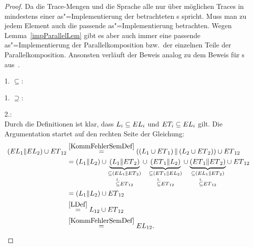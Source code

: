 \begin{proof}
  Da die Trace-Mengen und die Sprache alle nur über möglichen Traces in
  mindestens einer as"=Implementierung der betrachteten \MEIO{}s spricht. Muss
  man zu jedem Element auch die passende as"=Implementierung betrachten. Wegen
  Lemma~\ref{impParallelLem} gibt es aber auch immer eine passende
  as"=Implementierung der Parallelkomposition bzw.\ der einzelnen Teile der
  Parallelkomposition. Ansonsten verläuft der Beweis analog zu dem Beweis für
  \EIO{}s aus~\cite{Schinko2016BA}.

  1. \glqq$\subseteq$\grqq{}:\\

  1. \glqq$\supseteq$\grqq{}:\\

  2.:\\
  Durch die Definitionen ist klar, dass $L_i\subseteq EL _i$ und $ET
  _i\subseteq EL _i$ gilt. Die Argumentation startet auf den rechten Seite der
  Gleichung:
  \begin{align*}
    (EL{}_1\| EL{}_2)\cup ET{}_{12}&\overset{\ref{KommFehlerSemDef}}{=}\left(\left(L_1\cup
  ET{}_1\right)\|\left(L_2\cup ET{}_2\right)\right)\cup ET{}_{12}\\
    &=(L_1\|L_2) \cup \underset{\overset{1.}{\subseteq} ET{}_{12}}{\underset{\subseteq
    (EL{}_1\|ET{}_2)}{\underbrace{(L_1\|ET{}_2)}}} \cup
    \underset{\overset{1.}{\subseteq} ET{}_{12}}{\underset{\subseteq
    (ET{}_1\|EL{}_2)}{\underbrace{(ET{}_1\|L_2)}}} \cup
     \underset{\overset{1.}{\subseteq}
    ET{}_{12}}{\underset{\subseteq (EL{}_1\|ET{}_2)}{\underbrace{(ET{}_1\|ET{}_2)}}} \cup
    ET{}_{12}\\
    &=(L_1\|L_2) \cup ET{}_{12}\\
    &\overset{\ref{LDef}}{=}L_{12}\cup ET{}_{12}\\
    &\overset{\ref{KommFehlerSemDef}}{=}EL{}_{12}.
  \end{align*}
\end{proof}

